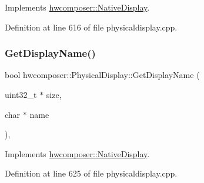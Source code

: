 Implements \mbox{\hyperlink{classhwcomposer_1_1NativeDisplay_a9479dcf82765996db6d7ea1cdcef3864}{hwcomposer\+::\+Native\+Display}}.



Definition at line 616 of file physicaldisplay.\+cpp.


\begin{DoxyCode}{0}
\end{DoxyCode}
\mbox{\label{classhwcomposer_1_1PhysicalDisplay_a1d0fe5aac11bc35aa95a55289993d9a8}} 
\subsubsection{\texorpdfstring{Get\+Display\+Name()}{GetDisplayName()}}
{\footnotesize\ttfamily bool hwcomposer\+::\+Physical\+Display\+::\+Get\+Display\+Name (\begin{DoxyParamCaption}\item[{uint32\+\_\+t $\ast$}]{size,  }\item[{char $\ast$}]{name }\end{DoxyParamCaption})\hspace{0.3cm}{\ttfamily [override]}, {\ttfamily [virtual]}}



Implements \mbox{\hyperlink{classhwcomposer_1_1NativeDisplay_a28c095d6d08c84e40b5d5160d038f0b5}{hwcomposer\+::\+Native\+Display}}.



Definition at line 625 of file physicaldisplay.\+cpp.


